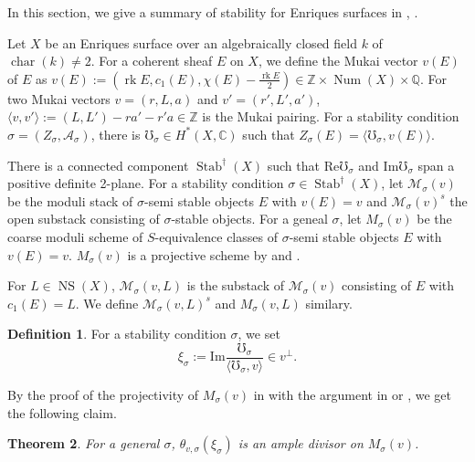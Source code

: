 \documentclass[leqno,11pt]{amsart}
\def\C{\ensuremath{\mathbb{C}}}
\def\Num{\mathop{\mathrm{Num}}\nolimits}
\def\NS{\mathop{\mathrm{NS}}\nolimits}
\def\rk{\mathop{\mathrm{rk}}}
\def\chr{\mathop{\mathrm{char}}\nolimits}
\def\Stab{\mathop{\mathrm{Stab}}}
\newtheorem{Thm}{Theorem}[section]
\theoremstyle{definition}
\newtheorem{Def}[Thm]{Definition}
\def\C{\ensuremath{\mathbb{C}}}
\def\AA{\ensuremath{\mathcal A}}
\def\MM{\ensuremath{\mathcal M}}
\def\Bbb{\mathbb}
\begin{document}
{\color{red}
In this section, we give  a summary of stability for Enriques surfaces in
\cite{Nue14a}, \cite{Yos16b}. 

Let $X$ be an Enriques surface over an algebraically 
closed field $k$ of $\chr(k) \ne 2$.
For a coherent sheaf $E$ on $X$, we define the Mukai vector $v(E)$
of $E$ as
$v(E):=(\rk E,c_1(E),\chi(E)-\frac{\rk E}{2})
\in {\Bbb Z} \times \Num(X) \times {\Bbb Q}$.
For two Mukai vectors $v=(r,L,a)$ and $v'=(r',L',a')$,
$\langle v,v' \rangle:=(L,L')-ra'-r'a \in {\Bbb Z}$ is the Mukai pairing.  
For a stability condition $\sigma=(Z_\sigma,\AA_\sigma)$,
there is $\mho_\sigma \in H^*(X,\C)$
such that $Z_\sigma(E)=\langle \mho_\sigma,v(E) \rangle$.

There is a connected component $\Stab^\dagger(X)$
such that $\mathrm{Re} \mho_\sigma$ and 
$\mathrm{Im} \mho_\sigma$ span a positive definite 2-plane.
For a stability condition $\sigma \in \Stab^\dagger(X)$,
let $\MM_\sigma(v)$ be the moduli stack of $\sigma$-semi stable objects $E$
with $v(E)=v$ and $\MM_\sigma(v)^s$ 
the open substack consisting of $\sigma$-stable
objects. 
For a geneal $\sigma$,
let $M_\sigma(v)$ be the coarse moduli scheme of $S$-equivalence
classes of $\sigma$-semi stable objects $E$ with $v(E)=v$. 
$M_\sigma(v)$ is a projective scheme by \cite[sect. 9]{Nuer} and \cite{Yos16b}.

For $L \in \NS(X)$,
$\MM_\sigma(v,L)$ is the substack of $\MM_\sigma(v)$
consisting of $E$ with $c_1(E)=L$.
We define $\MM_\sigma(v,L)^s$ and $M_\sigma(v,L)$ similary.


\begin{Def}
For a stability condition $\sigma$, we set
\begin{equation}
\xi_\sigma:=\mathrm{Im}\frac{ \mho_\sigma}{\langle \mho_\sigma, v \rangle}
\in v^\perp.
\end{equation}
\end{Def}

By the proof of the projectivity of $M_\sigma(v)$ in \cite{Yos16b} with the argument
in \cite{MYY14} or \cite{BM14a}, we get the following claim.
\begin{Thm}
For a general $\sigma$,
$\theta_{v,\sigma}(\xi_\sigma)$ is an ample divisor 
on $M_\sigma(v)$.
\end{Thm}



}
\end{document}
